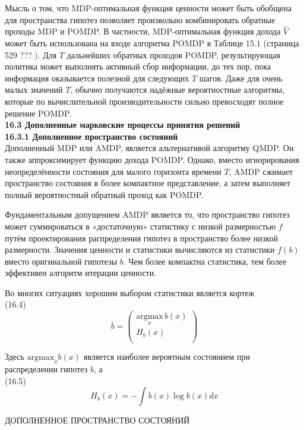 \documentclass[10pt,a4paper]{article}
\begin{document}
Мысль о том, что MDP-оптимальная функция  ценности может быть обобщена для пространства гипотез позволяет произвольно комбинировать обратные проходы MDP и POMDP. В частности, MDP-оптимальная функция дохода $\hat{V}$ может быть использована на входе алгоритма POMDP в Таблице 15.1 (страница 529 ??? ). Для $T$ дальнейших обратных проходов POMDP, результирующая политика может выполнять активный сбор информации, до тех пор, пока информация оказывается полезной для следующих $T$ шагов. Даже для очень малых значений $T$, обычно получаются надёжные вероятностные алгоритмы, которые по вычислительной производительности сильно превосходят полное решение POMDP.\\

\textbf{16.3	Дополненные марковские процессы принятия решений}\\

\textbf{16.3.1	Дополненное пространство состояний}\\

Дополненный MDP или AMDP, является альтернативой алгоритму QMDP. Он также аппроксимирует функцию дохода POMDP. Однако, вместо игнорирования неопределённости состояния для малого горизонта времени $T$, AMDP сжимает пространство состояния в более компактное представление, а затем выполняет полный вероятностный обратный проход как POMDP.

Фундаментальным допущением AMDP является то, что пространство гипотез может суммироваться в «достаточную» статистику с низкой размерностью $f$ путём проектирования распределения гипотез в пространство более низкой размерности. Значения ценности и статистики вычисляются из статистики $f (b)$ вместо оригинальной гипотезы $b$. Чем более компактна статистика, тем более эффективен алгоритм итерации ценности.

Во многих ситуациях хорошим выбором статистики является кортеж\\

(16.4)
$$\bar{b}=\left(\begin{array}{c}
\underset{x}{\text{argmax}}\,b(x)\\
H_b(x)\\
\end{array}\right)$$

Здесь $\text{argmax}_x b(x)$ является наиболее вероятным состоянием при распределении гипотез $b$, а\\

(16.5) 
$$H_b(x)=-\int b(x)\log b(x)dx$$

ДОПОЛНЕННОЕ ПРОСТРАНСТВО СОСТОЯНИЙ\\
\end{document}
